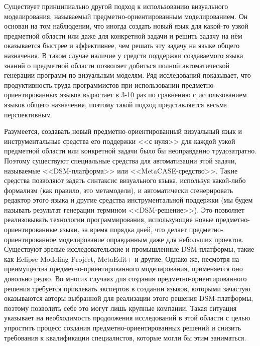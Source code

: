 Существует принципиально другой подход к использованию визуального 
моделирования, называемый предметно-ориентированным моделированием. Он основан на том наблюдении, что иногда создать новый 
язык для какой-то узкой предметной области или даже для конкретной задачи и решить задачу 
на нём оказывается быстрее и эффективнее, чем решать эту задачу на языке общего назначения. 
В таком случае наличие у средств поддержки создаваемого языка знаний о предметной области 
позволяет добиться полной автоматической генерации программ по визуальным моделям.
Ряд исследований показывает, что продуктивность труда программистов при использовании 
предметно-ориентированных языков вырастает в 3-10 раз по сравнению с 
использованием языков общего назначения, поэтому такой подход представляется 
весьма перспективным.

Разумеется, создавать новый предметно-ориентированный визуальный язык и 
инструментальные средства его поддержки <<с нуля>> для каждой узкой предметной 
области или конкретной задачи было бы неоправданно трудозатратно. Поэтому 
существуют специальные средства для автоматизации этой задачи, называемые 
<<DSM-платформа>> или <<MetaCASE-средство>>. Такие средства позволяют задать 
синтаксис визуального языка, используя какой-либо формализм (как правило, 
это метамодели), и автоматически сгенерировать редактор этого языка и другие средства инструментальной 
поддержки (мы будем называть результат генерации термином <<DSM-решение>>). 
Это позволяет реализовывать технологии программирования, использующие новые предметно-ориентированные языки, за время 
порядка дней, что делает предметно-ориентированное моделирование оправданным 
даже для небольших проектов. Существуют зрелые исследовательские и промышленные 
DSM-платформы, такие как Eclipse Modeling Project, MetaEdit+ и другие. Однако же, 
несмотря на преимущества предметно-ориентированного моделирования, применяется оно 
довольно редко. Во многих случаях для создания предметно-ориентированного 
решения требуется привлекать экспертов в создании языков, которыми зачастую 
оказываются авторы выбранной для реализации этого решения DSM-платформы, поэтому 
позволить себе это могут лишь крупные компании. Такая ситуация указывает на 
необходимость продолжения исследований в этой области с целью упростить процесс создания
предметно-ориентированных решений и снизить требования к квалификации специалистов, 
которые могли бы этим заниматься.

